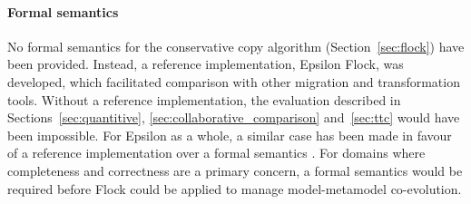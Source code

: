 \paragraph{Formal semantics} No formal semantics for the conservative copy algorithm (Section~\ref{sec:flock}) have been provided. Instead, a reference implementation, Epsilon Flock, was developed, which facilitated comparison with other migration and transformation tools. Without a reference implementation, the evaluation described in Sections~\ref{sec:quantitive}, \ref{sec:collaborative_comparison} and~\ref{sec:ttc} would have been impossible. For \cc Epsilon as a whole, a similar case has been made in favour of a reference implementation over a formal semantics \cite{kolovos09thesis}. For domains where completeness and correctness are a primary concern, a formal semantics would be required before Flock could be applied to manage model-metamodel co-evolution.  
